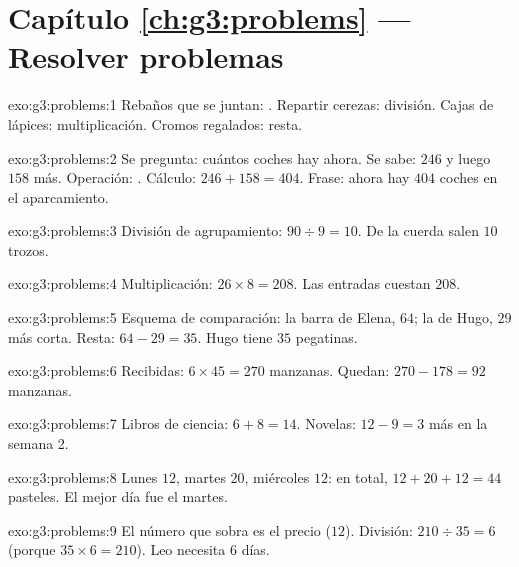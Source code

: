 \section*{Capítulo \ref{ch:g3:problems} --- Resolver problemas}

\begin{solution}{exo:g3:problems:1}
Rebaños que se juntan: . Repartir cerezas: división. Cajas de
lápices: multiplicación. Cromos regalados: resta.
\end{solution}

\begin{solution}{exo:g3:problems:2}
Se pregunta: cuántos coches hay ahora. Se sabe: $246$ y luego $158$ más.
Operación: . Cálculo: $246 + 158 = 404$. Frase: ahora hay
$404$ coches en el aparcamiento.
\end{solution}

\begin{solution}{exo:g3:problems:3}
División de agrupamiento: $90 \div 9 = 10$. De la cuerda salen $10$ trozos.
\end{solution}

\begin{solution}{exo:g3:problems:4}
Multiplicación: $26 \times 8 = 208$. Las entradas cuestan $208$.
\end{solution}

\begin{solution}{exo:g3:problems:5}
Esquema de comparación: la barra de Elena, $64$; la de Hugo, $29$ más corta.
Resta: $64 - 29 = 35$. Hugo tiene $35$ pegatinas.
\end{solution}

\begin{solution}{exo:g3:problems:6}
Recibidas: $6 \times 45 = 270$ manzanas. Quedan:
$270 - 178 = 92$ manzanas.
\end{solution}

\begin{solution}{exo:g3:problems:7}
Libros de ciencia: $6 + 8 = 14$. Novelas: $12 - 9 = 3$ más en la semana 2.
\end{solution}

\begin{solution}{exo:g3:problems:8}
Lunes $12$, martes $20$, miércoles $12$: en total,
$12 + 20 + 12 = 44$ pasteles. El mejor día fue el martes.
\end{solution}

\begin{solution}{exo:g3:problems:9}
El número que sobra es el precio ($12$). División:
$210 \div 35 = 6$ (porque $35 \times 6 = 210$). Leo necesita $6$ días.
\end{solution}

